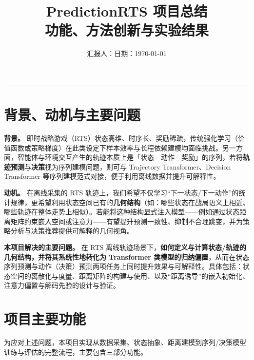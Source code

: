 \documentclass[UTF8,11pt]{ctexart}
\title{\textbf{PredictionRTS 项目总结}\\{\large 功能、方法创新与实验结果}}
\author{汇报人：\qquad\qquad\quad 日期：\today}
\date{}
\begin{document}
\maketitle
\vspace{-1em}
\noindent\rule{\linewidth}{0.8pt}
\vspace{1em}

\section{背景、动机与主要问题}
\label{sec:motivation-problem}

\textbf{背景。} 即时战略游戏（RTS）状态高维、时序长、奖励稀疏，传统强化学习（价值函数或策略梯度）在此类设定下样本效率与长程依赖建模均面临挑战。另一方面，智能体与环境交互产生的轨迹本质上是「状态—动作—奖励」的序列，若将\textbf{轨迹预测}与\textbf{决策}视为序列建模问题，则可与 Trajectory Transformer、Decision Transformer 等序列建模范式对接，便于利用离线数据并提升可解释性。

\textbf{动机。} 在离线采集的 RTS 轨迹上，我们希望不仅学习“下一状态/下一动作”的统计规律，更希望利用状态空间已有的\textbf{几何结构}（如：哪些状态在战局语义上相近、哪些轨迹在整体走势上相似）。若能将这种结构显式注入模型——例如通过状态距离矩阵约束嵌入空间或注意力——有望提升预测一致性、抑制不合理跳变，并为策略分析与决策推荐提供可解释的几何视角。

\textbf{本项目解决的主要问题。} 在 RTS 离线轨迹场景下，\textbf{如何定义与计算状态/轨迹的几何结构，并将其系统性地转化为 Transformer 类模型的归纳偏置}，从而在状态序列预测与动作（决策）预测两项任务上同时提升效果与可解释性。具体包括：状态空间的离散化与度量、距离矩阵的构建与使用、以及“距离诱导”的嵌入初始化、注意力偏置与解码先验的设计与验证。

\vspace{0.5em}

\section{项目主要功能}
\label{sec:function}

为应对上述问题，本项目实现从数据采集、状态抽象、距离建模到序列/决策模型训练与评估的完整流程，主要包含三部分功能。
\end{document}

